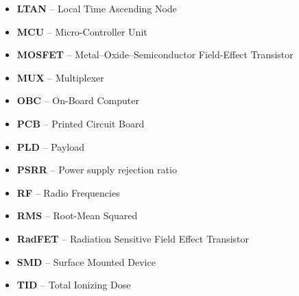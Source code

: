 \begin{itemize}
    \item    \textbf{LTAN}     --    Local Time Ascending Node
    \item    \textbf{MCU}      --    Micro-Controller Unit
    \item    \textbf{MOSFET}   --    Metal–Oxide–Semiconductor Field-Effect Transistor
    \item    \textbf{MUX}      --    Multiplexer
    \item    \textbf{OBC}      --    On-Board Computer
    \item    \textbf{PCB}      --    Printed Circuit Board
    \item    \textbf{PLD}      --    Payload
    \item    \textbf{PSRR}     --    Power supply rejection ratio
    \item    \textbf{RF}       --    Radio Frequencies
    \item    \textbf{RMS}      --    Root-Mean Squared
    \item    \textbf{RadFET}   --    Radiation Sensitive Field Effect Transistor
    \item    \textbf{SMD}      --    Surface Mounted Device
    \item    \textbf{TID}      --    Total Ionizing Dose
\end{itemize}